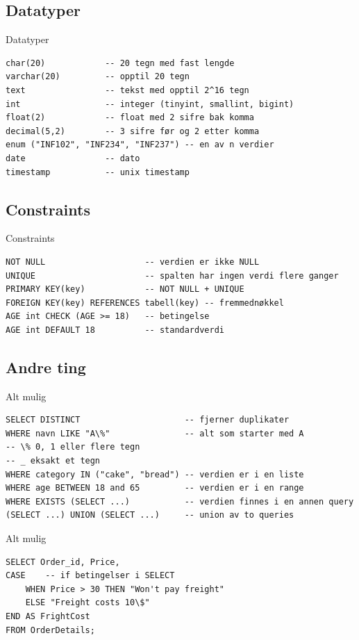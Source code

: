 \subsection*{Datatyper}
\begin{frame}[fragile]{Datatyper}
\begin{verbatim}
char(20)            -- 20 tegn med fast lengde
varchar(20)         -- opptil 20 tegn
text                -- tekst med opptil 2^16 tegn
int                 -- integer (tinyint, smallint, bigint)
float(2)            -- float med 2 sifre bak komma
decimal(5,2)        -- 3 sifre før og 2 etter komma
enum ("INF102", "INF234", "INF237") -- en av n verdier
date                -- dato
timestamp           -- unix timestamp
\end{verbatim}
\end{frame}

\subsection*{Constraints}
\begin{frame}[fragile]{Constraints}
\begin{verbatim}
NOT NULL                    -- verdien er ikke NULL
UNIQUE                      -- spalten har ingen verdi flere ganger
PRIMARY KEY(key)            -- NOT NULL + UNIQUE
FOREIGN KEY(key) REFERENCES tabell(key) -- fremmednøkkel
AGE int CHECK (AGE >= 18)   -- betingelse
AGE int DEFAULT 18          -- standardverdi
\end{verbatim}
\end{frame}

\subsection*{Andre ting}
\begin{frame}[fragile]{Alt mulig}
\begin{verbatim}
SELECT DISTINCT                     -- fjerner duplikater
WHERE navn LIKE "A\%"               -- alt som starter med A
-- \% 0, 1 eller flere tegn
-- _ eksakt et tegn
WHERE category IN ("cake", "bread") -- verdien er i en liste
WHERE age BETWEEN 18 and 65         -- verdien er i en range
WHERE EXISTS (SELECT ...)           -- verdien finnes i en annen query
(SELECT ...) UNION (SELECT ...)     -- union av to queries
\end{verbatim}
\end{frame}

\begin{frame}[fragile]{Alt mulig}
\begin{verbatim}
SELECT Order_id, Price,
CASE    -- if betingelser i SELECT
    WHEN Price > 30 THEN "Won't pay freight"
    ELSE "Freight costs 10\$"
END AS FrightCost
FROM OrderDetails; 
\end{verbatim}
\end{frame}

